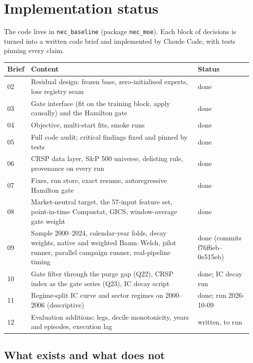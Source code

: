 \section{Implementation status}
\label{sec:status}

The code lives in \texttt{nec\_baseline} (package \texttt{nec\_moe}). Each block of decisions is turned into
a written code brief and implemented by Claude Code, with tests pinning every claim.

{\small
\begin{tabularx}{\textwidth}{@{}l X l@{}}
\toprule
Brief & Content & Status\\
\midrule
02 & Residual design: frozen base, zero-initialised experts, loss registry seam & done\\
03 & Gate interface (fit on the training block, apply causally) and the Hamilton gate & done\\
04 & Objective, multi-start fits, smoke runs & done\\
05 & Full code audit; critical findings fixed and pinned by tests & done\\
06 & CRSP data layer, S\&P 500 universe, delisting rule, provenance on every run & done\\
07 & Fixes, run store, exact resume, autoregressive Hamilton gate & done\\
08 & Market-neutral target, the 57-input feature set, point-in-time Compustat, GICS, window-average gate weight & done\\
09 & Sample 2000--2024, calendar-year folds, decay weights, native and weighted Baum--Welch, pilot runner,
parallel campaign runner, real-pipeline timing & done (commits f76f6eb--0e515eb)\\
10 & Gate filter through the purge gap (Q22), CRSP index as the gate series (Q23), IC decay script & done; IC decay run\\
11 & Regime-split IC curve and sector regimes on 2000--2006 (descriptive) & done; run 2026-10-09\\
12 & Evaluation additions: legs, decile monotonicity, years and episodes, execution lag & written, to run\\
\bottomrule
\end{tabularx}}

\subsection{What exists and what does not}

